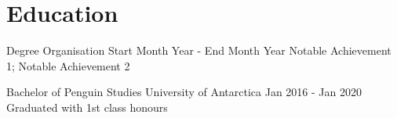 \section*{Education}

\componentlist
    {Degree}
    {Organisation}
    {Start Month Year - End Month Year}
    {
        Notable Achievement 1;
        Notable Achievement 2
    }

\componentlist
    {Bachelor of Penguin Studies}
    {University of Antarctica}
    {Jan 2016 - Jan 2020}
    {
        Graduated with 1st class honours
    }